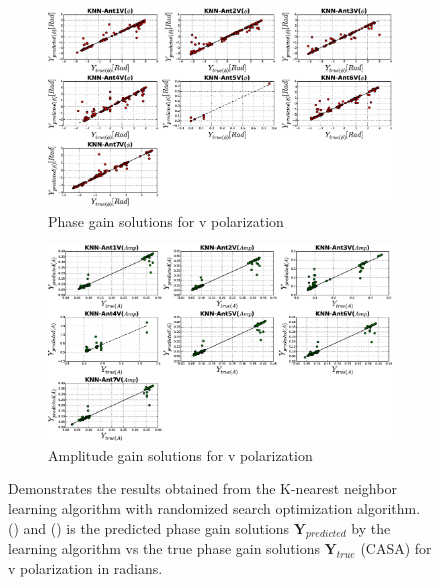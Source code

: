 \begin{figure}[H]
   \centering
    \begin{subfigure}[t]{0.52\textheight}
        
        \includegraphics[width=\textwidth]{images/KNNVphase.eps} 
        \caption{Phase gain solutions for v polarization} \label{A5}
    \end{subfigure}
    
      \begin{subfigure}[t]{0.52\textheight}
       
        \includegraphics[width=\textwidth]{images/KNNVamp.eps} 
        \caption{Amplitude gain solutions for v polarization} \label{B5}
    \end{subfigure}
    \caption{Demonstrates the results obtained from the K-nearest neighbor learning algorithm with randomized search optimization algorithm. () and () is the predicted phase gain solutions $\textbf{Y}_{predicted}$ by the learning algorithm vs the true phase gain solutions $\textbf{Y}_{true}$ (CASA) for v polarization in radians. }
    \end{figure} 
   

